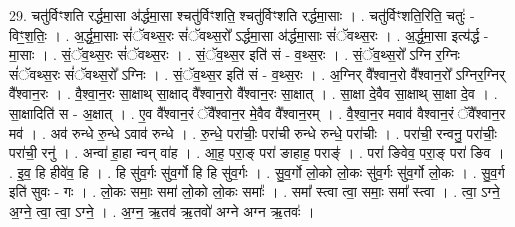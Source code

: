 \documentclass[17pt]{extarticle}
\begin{document}
29. चतु॑र्विꣳशति रर्द्धमा॒सा अ॑र्द्धमा॒सा श्चतु॑र्विꣳशति॒ श्चतु॑र्विꣳशति रर्द्धमा॒साः । . चतु॑र्विꣳशति॒रिति॒ चतुः॑ - विꣳ॒॒श॒तिः॒ । . अ॒र्द्ध॒मा॒साः सं॑ॅवथ्स॒रः सं॑ॅवथ्स॒रो᳚ ऽर्द्धमा॒सा अ॑र्द्धमा॒साः सं॑ॅवथ्स॒रः । . अ॒र्द्ध॒मा॒सा इत्य॑र्द्ध - मा॒साः । . सं॒ॅव॒थ्स॒रः सं॑ॅवथ्स॒रः । . सं॒ॅव॒थ्स॒र इति॑ सं - व॒थ्स॒रः । . सं॒ॅव॒थ्स॒रो᳚ ऽग्नि र॒ग्निः सं॑ॅवथ्स॒रः सं॑ॅवथ्स॒रो᳚ ऽग्निः । . सं॒ॅव॒थ्स॒र इति॑ सं - व॒थ्स॒रः । . अ॒ग्निर् वै᳚श्वान॒रो वै᳚श्वान॒रो᳚ ऽग्निर॒ग्निर् वै᳚श्वान॒रः । . वै॒श्वा॒न॒रः सा॒क्षाथ् सा॒क्षाद् वै᳚श्वान॒रो वै᳚श्वान॒रः सा॒क्षात् । . सा॒क्षा दे॒वैव सा॒क्षाथ् सा॒क्षा दे॒व । . सा॒क्षादिति॑ स - अ॒क्षात् । . ए॒व वै᳚श्वान॒रं ॅवै᳚श्वान॒र मे॒वैव वै᳚श्वान॒रम् । . वै॒श्वा॒न॒र मवाव॑ वैश्वान॒रं ॅवै᳚श्वान॒र मव॑ । . अव॑ रुन्धे रु॒न्धे ऽवाव॑ रुन्धे । . रु॒न्धे॒ परा॑चीः॒ परा॑ची रुन्धे रुन्धे॒ परा॑चीः । . परा॑ची॒ रन्वनु॒ परा॑चीः॒ परा॑ची॒ रनु॑ । . अन्वा॑ हा॒हा न्वन् वा॑ह । . आ॒ह॒ परा॒ङ् परा॑ ङाहाह॒ पराङ्॑ । . परा॑ ङिवेव॒ परा॒ङ् परा॑ ङिव । . इ॒व॒ हि हीवे॑व॒ हि । . हि सु॑व॒र्गः सु॑व॒र्गो हि हि सु॑व॒र्गः । . सु॒व॒र्गो लो॒को लो॒कः सु॑व॒र्गः सु॑व॒र्गो लो॒कः । . सु॒व॒र्ग इति॑ सुवः - गः । . लो॒कः समाः॒ समा॑ लो॒को लो॒कः समाः᳚ । . समा᳚ स्त्वा त्वा॒ समाः॒ समा᳚ स्त्वा । . त्वा॒ ऽग्ने॒ अ॒ग्ने॒ त्वा॒ त्वा॒ ऽग्ने॒ । . अ॒ग्न॒ ऋ॒तव॑ ऋ॒तवो॑ अग्ने अग्न ऋ॒तवः॑ । \newline
\end{document}
